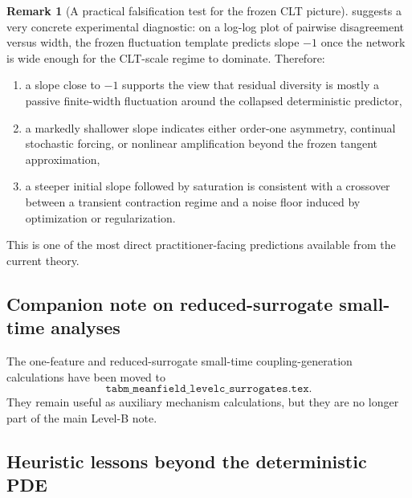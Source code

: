 \documentclass[11pt]{article}
\theoremstyle{definition}
\newtheorem{remark}[theorem]{Remark}
\begin{document}
\begin{remark}[A practical falsification test for the frozen CLT picture]
\label{rem:frozen-loglog}
 suggests a very concrete experimental diagnostic:
on a log-log plot of pairwise disagreement versus width, the frozen fluctuation template predicts slope $-1$ once the network is wide enough for the CLT-scale regime to dominate.
Therefore:
\begin{enumerate}[leftmargin=2em]
  \item a slope close to $-1$ supports the view that residual diversity is mostly a passive finite-width fluctuation around the collapsed deterministic predictor,
  \item a markedly shallower slope indicates either order-one asymmetry, continual stochastic forcing, or nonlinear amplification beyond the frozen tangent approximation,
  \item a steeper initial slope followed by saturation is consistent with a crossover between a transient contraction regime and a noise floor induced by optimization or regularization.
\end{enumerate}
This is one of the most direct practitioner-facing predictions available from the current theory.
\end{remark}

\subsection{Companion note on reduced-surrogate small-time analyses}

The one-feature and reduced-surrogate small-time coupling-generation calculations have been moved to
\[
  \texttt{tabm\_meanfield\_levelc\_surrogates.tex}.
\]
They remain useful as auxiliary mechanism calculations, but they are no longer part of the main Level-B note.

\subsection{Heuristic lessons beyond the deterministic PDE}
\end{document}
